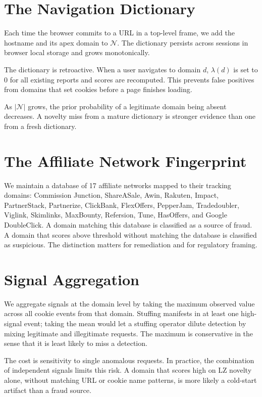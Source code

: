 \documentclass[10pt,twocolumn,letterpaper]{article}
\begin{document}
\section{The Navigation Dictionary}

Each time the browser commits to a URL in a top-level frame, we add the
hostname and its apex domain to $\mathcal{N}$. The dictionary persists
across sessions in browser local storage and grows monotonically.

The dictionary is retroactive. When a user navigates to domain $d$,
$\lambda(d)$ is set to 0 for all existing reports and scores are
recomputed. This prevents false positives from domains that set cookies
before a page finishes loading.

As $|\mathcal{N}|$ grows, the prior probability of a legitimate domain
being absent decreases. A novelty miss from a mature dictionary is stronger
evidence than one from a fresh dictionary.

\section{The Affiliate Network Fingerprint}

We maintain a database of 17 affiliate networks mapped to their tracking
domains: Commission Junction, ShareASale, Awin, Rakuten, Impact,
PartnerStack, Partnerize, ClickBank, FlexOffers, PepperJam, Tradedoubler,
Viglink, Skimlinks, MaxBounty, Refersion, Tune, HasOffers, and Google
DoubleClick. A domain matching this database is classified as a source of
fraud. A domain that scores above threshold without matching the database is
classified as suspicious. The distinction matters for remediation and for
regulatory framing.

\section{Signal Aggregation}
\label{sec:aggregation}

We aggregate signals at the domain level by taking the maximum observed
value across all cookie events from that domain. Stuffing manifests in at
least one high-signal event; taking the mean would let a stuffing operator
dilute detection by mixing legitimate and illegitimate requests. The maximum
is conservative in the sense that it is least likely to miss a detection.

The cost is sensitivity to single anomalous requests. In practice, the
combination of independent signals limits this risk. A domain that scores
high on LZ novelty alone, without matching URL or cookie name patterns,
is more likely a cold-start artifact than a fraud source.
\end{document}
